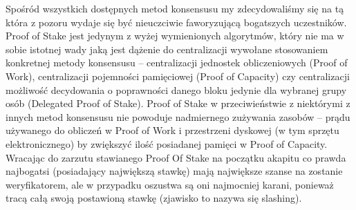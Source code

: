 Spośród wszystkich dostępnych metod konsensusu my zdecydowaliśmy się na tą która z pozoru wydaje się być nieuczciwie faworyzującą bogatszych uczestników. Proof of Stake jest jedynym z wyżej wymienionych algorytmów, który nie ma w sobie istotnej wady jaką jest dążenie do centralizacji wywołane stosowaniem konkretnej metody konsensusu – centralizacji jednostek obliczeniowych (Proof of Work), centralizacji pojemności pamięciowej (Proof of Capacity) czy centralizacji możliwość decydowania o poprawności danego bloku jedynie dla wybranej grupy osób (Delegated Proof of Stake). Proof of Stake w przeciwieństwie z niektórymi z innych metod konsensusu nie powoduje nadmiernego zużywania zasobów – prądu używanego do obliczeń w Proof of Work i przestrzeni dyskowej (w tym sprzętu elektronicznego) by zwiększyć ilość posiadanej pamięci w Proof of Capacity. Wracając do zarzutu stawianego Proof Of Stake na początku akapitu co prawda najbogatsi (posiadający największą stawkę) mają największe szanse na zostanie weryfikatorem, ale w przypadku oszustwa są oni najmocniej karani, ponieważ tracą całą swoją postawioną stawkę (zjawisko to nazywa się slashing).
